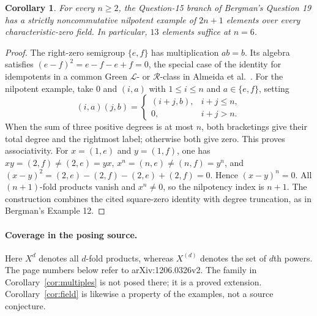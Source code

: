 \documentclass[11pt]{article}
\newtheorem{corollary}[theorem]{Corollary}
\begin{document}
\begin{corollary}\label{cor:small19}
For every $n\ge2$, the Question-15 branch of Bergman's Question 19
has a strictly noncommutative nilpotent example of $2n+1$ elements
over every characteristic-zero field. In particular, $13$ elements
suffice at $n=6$.
\end{corollary}
\begin{proof}
The right-zero semigroup $\{e,f\}$ has multiplication $ab=b$.
Its algebra satisfies $(e-f)^2=e-f-e+f=0$, the special case of
the identity for idempotents in a common Green $\mathcal L$- or
$\mathcal R$-class in Almeida et al.~\cite[p.\ 11]{AMSV}.
For the nilpotent example, take $0$ and $(i,a)$ with $1\le i\le n$
and $a\in\{e,f\}$, setting
\[
(i,a)(j,b)=
\begin{cases}(i+j,b),&i+j\le n,\\0,&i+j>n.\end{cases}
\]
When the sum of three positive degrees is at most $n$, both bracketings
give their total degree and the rightmost label; otherwise both give zero.
This proves associativity. For $x=(1,e)$ and $y=(1,f)$, one has
$xy=(2,f)\ne(2,e)=yx$, $x^n=(n,e)\ne(n,f)=y^n$, and
$(x-y)^2=(2,e)-(2,f)-(2,e)+(2,f)=0$.
Hence $(x-y)^n=0$. All $(n+1)$-fold products vanish and $x^n\ne0$,
so the nilpotency index is $n+1$. The construction combines the cited
square-zero identity with degree truncation, as in Bergman's Example 12.
\end{proof}

\paragraph{Coverage in the posing source.}
Here $X^d$ denotes all $d$-fold products, whereas $X^{(d)}$ denotes the
set of $d$th powers. The page numbers below refer to arXiv:1206.0326v2.
The family in Corollary~\ref{cor:multiples} is not posed there; it is a
proved extension. Corollary~\ref{cor:field} is likewise a property of the
examples, not a source conjecture.
\end{document}
